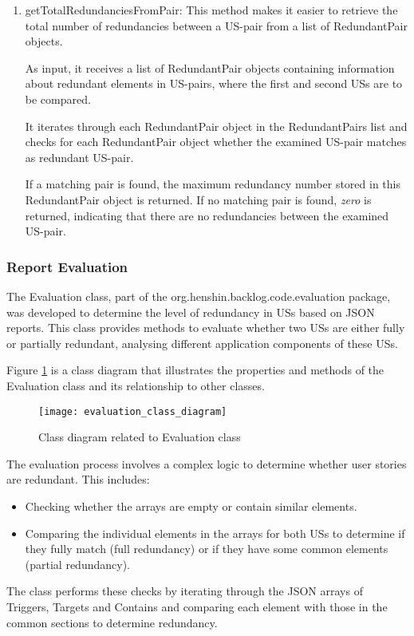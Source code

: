 \begin{enumerate}
	\item getTotalRedundanciesFromPair: This method makes it easier to retrieve the total number of redundancies between a US-pair from a list of RedundantPair objects.
	
	As input, it receives a list of RedundantPair objects containing information about redundant elements in US-pairs, where the first and second USs are to be compared.
	
	It iterates through each RedundantPair object in the RedundantPairs list and checks for each RedundantPair object whether the examined US-pair matches as redundant US-pair. 
	
	If a matching pair is found, the maximum redundancy number stored in this RedundantPair object is returned. If no matching pair is found, \textit{zero} is returned, indicating that there are no redundancies between the examined US-pair.
\end{enumerate}
\subsubsection*{Report Evaluation}
The Evaluation class, part of the org.henshin.backlog.code.evaluation package, was developed to determine the level of redundancy in USs based on JSON reports. This class provides methods to evaluate whether two USs are either fully or partially redundant, analysing different application components of these USs.

Figure \ref{fig:evaluation_class_diagram} is a class diagram that illustrates the properties and methods of the Evaluation class and its relationship to other classes.

\begin{figure}[h]
\centering 
\texttt{[image: evaluation\_class\_diagram]}
\caption{Class diagram related to Evaluation class}\label{fig:evaluation_class_diagram}
\end{figure} 

The evaluation process involves a complex logic to determine whether user stories are redundant. This includes:
\begin{itemize}
	\item Checking whether the arrays are empty or contain similar elements.
	\item Comparing the individual elements in the arrays for both USs to determine if they fully match (full redundancy) or if they have some common elements (partial redundancy).
\end{itemize}
The class performs these checks by iterating through the JSON arrays of Triggers, Targets and Contains and comparing each element with those in the common sections to determine redundancy.

